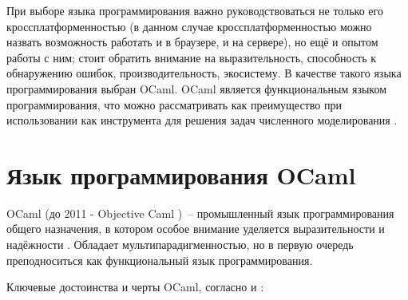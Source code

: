При выборе языка программирования важно руководствоваться не только его кроссплатформенностью
(в данном случае кроссплатформенностью можно назвать возможность работать и в браузере, и на сервере),
но ещё и опытом работы с ним; стоит обратить внимание на выразительность, способность к обнаружению ошибок,
производительность, экосистему. В качестве такого языка программирования выбран OCaml.
OCaml является функциональным языком программирования, что можно рассматривать как преимущество
при использовании как инструмента для решения задач численного моделирования \cite{shutov-haskell}.

\section{Язык программирования OCaml}

OCaml (до 2011 - Objective Caml \cite{camlhistory})~-- промышленный язык программирования общего назначения,
в котором особое внимание уделяется выразительности и надёжности \cite{ocamlorg}. Обладает
мультипарадигменностью, но в первую очередь преподноситься как функциональный язык программирования.

Ключевые достоинства и черты OCaml, согласно \cite[c.~3]{yaron2011} и \cite{rwo-prologue}:

